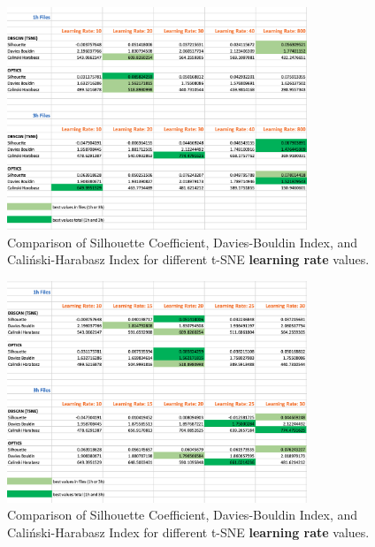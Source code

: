 \begin{figure}
  \centering
  \includegraphics[width=0.8\textwidth]{./images/tsneParametersTest/learningRate/learningRateEvaluationScoresAverageDetailed2.png}
  \caption{Comparison of Silhouette Coefficient, Davies-Bouldin Index, and Caliński-Harabasz Index for different t-SNE \textbf{learning rate} values.}
  \label{figure:learningRateEvaluationScoresAverageDetailed2}
\end{figure}

\begin{figure}
  \centering
  \includegraphics[width=0.8\textwidth]{./images/tsneParametersTest/learningRate/learningRateEvaluationScoresAverageDetailed3.png}
  \caption{Comparison of Silhouette Coefficient, Davies-Bouldin Index, and Caliński-Harabasz Index for different t-SNE \textbf{learning rate} values.}
  \label{figure:learningRateEvaluationScoresAverageDetailed3}
\end{figure}






